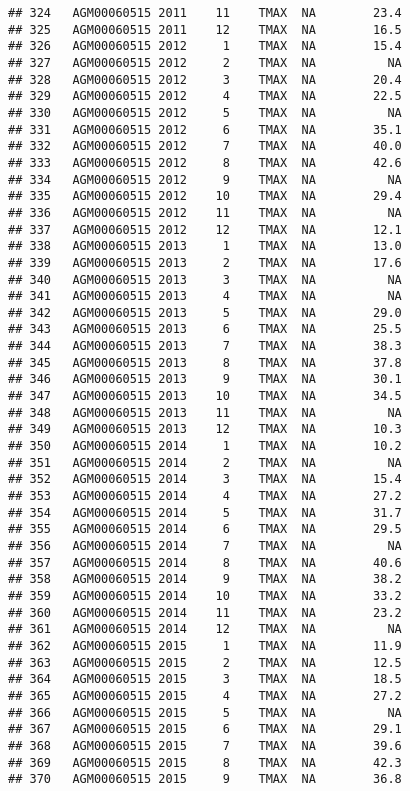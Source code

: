 \documentclass{article}\usepackage[]{graphicx}\usepackage[]{color}
\makeatletter
\newenvironment{kframe}{%
 \def\at@end@of@kframe{}%
 \ifinner\ifhmode%
  \def\at@end@of@kframe{\end{minipage}}%
  \begin{minipage}{\columnwidth}%
 \fi\fi%
 \def\FrameCommand##1{\hskip\@totalleftmargin \hskip-\fboxsep
 \colorbox{shadecolor}{##1}\hskip-\fboxsep
     \hskip-\linewidth \hskip-\@totalleftmargin \hskip\columnwidth}%
 \MakeFramed {\advance\hsize-\width
   \@totalleftmargin\z@ \linewidth\hsize
   \@setminipage}}%
 {\par\unskip\endMakeFramed%
 \at@end@of@kframe}
\newenvironment{knitrout}{}{} %
\makeatother
\begin{document}
\begin{knitrout}
\begin{kframe}
\begin{verbatim}
## 324   AGM00060515 2011    11    TMAX  NA        23.4
## 325   AGM00060515 2011    12    TMAX  NA        16.5
## 326   AGM00060515 2012     1    TMAX  NA        15.4
## 327   AGM00060515 2012     2    TMAX  NA          NA
## 328   AGM00060515 2012     3    TMAX  NA        20.4
## 329   AGM00060515 2012     4    TMAX  NA        22.5
## 330   AGM00060515 2012     5    TMAX  NA          NA
## 331   AGM00060515 2012     6    TMAX  NA        35.1
## 332   AGM00060515 2012     7    TMAX  NA        40.0
## 333   AGM00060515 2012     8    TMAX  NA        42.6
## 334   AGM00060515 2012     9    TMAX  NA          NA
## 335   AGM00060515 2012    10    TMAX  NA        29.4
## 336   AGM00060515 2012    11    TMAX  NA          NA
## 337   AGM00060515 2012    12    TMAX  NA        12.1
## 338   AGM00060515 2013     1    TMAX  NA        13.0
## 339   AGM00060515 2013     2    TMAX  NA        17.6
## 340   AGM00060515 2013     3    TMAX  NA          NA
## 341   AGM00060515 2013     4    TMAX  NA          NA
## 342   AGM00060515 2013     5    TMAX  NA        29.0
## 343   AGM00060515 2013     6    TMAX  NA        25.5
## 344   AGM00060515 2013     7    TMAX  NA        38.3
## 345   AGM00060515 2013     8    TMAX  NA        37.8
## 346   AGM00060515 2013     9    TMAX  NA        30.1
## 347   AGM00060515 2013    10    TMAX  NA        34.5
## 348   AGM00060515 2013    11    TMAX  NA          NA
## 349   AGM00060515 2013    12    TMAX  NA        10.3
## 350   AGM00060515 2014     1    TMAX  NA        10.2
## 351   AGM00060515 2014     2    TMAX  NA          NA
## 352   AGM00060515 2014     3    TMAX  NA        15.4
## 353   AGM00060515 2014     4    TMAX  NA        27.2
## 354   AGM00060515 2014     5    TMAX  NA        31.7
## 355   AGM00060515 2014     6    TMAX  NA        29.5
## 356   AGM00060515 2014     7    TMAX  NA          NA
## 357   AGM00060515 2014     8    TMAX  NA        40.6
## 358   AGM00060515 2014     9    TMAX  NA        38.2
## 359   AGM00060515 2014    10    TMAX  NA        33.2
## 360   AGM00060515 2014    11    TMAX  NA        23.2
## 361   AGM00060515 2014    12    TMAX  NA          NA
## 362   AGM00060515 2015     1    TMAX  NA        11.9
## 363   AGM00060515 2015     2    TMAX  NA        12.5
## 364   AGM00060515 2015     3    TMAX  NA        18.5
## 365   AGM00060515 2015     4    TMAX  NA        27.2
## 366   AGM00060515 2015     5    TMAX  NA          NA
## 367   AGM00060515 2015     6    TMAX  NA        29.1
## 368   AGM00060515 2015     7    TMAX  NA        39.6
## 369   AGM00060515 2015     8    TMAX  NA        42.3
## 370   AGM00060515 2015     9    TMAX  NA        36.8

\end{verbatim}
\end{kframe}
\end{knitrout}
\end{document}
